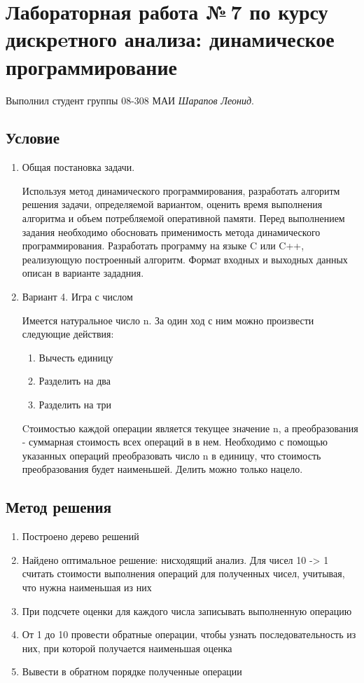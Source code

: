 \documentclass[12pt]{article}
\begin{document}
\section*{Лабораторная работа №\,7 по курсу дискрeтного анализа: динамическое программирование}

Выполнил студент группы 08-308 МАИ \textit{Шарапов Леонид}.

\subsection*{Условие}
\begin{enumerate}
\item Общая постановка задачи.

Используя метод динамического программирования, разработать алгоритм решения задачи, определяемой вариантом, оценить время выполнения алгоритма и объем потребляемой оперативной памяти. Перед выполнением задания необходимо обосновать применимость метода динамического программирования. Разработать программу на языке C или C++, реализующую построенный алгоритм. Формат входных и выходных данных описан в варианте зададния.

\item Вариант 4. Игра с числом

Имеется натуральное число n. За один ход с ним можно произвести следующие действия:

\begin{enumerate}
\item Вычесть единицу
\item Разделить на два
\item Разделить на три
\end{enumerate}

Cтоимостью каждой операции является текущее значение n, а преобразования - суммарная стоимость всех операций в в нем. Необходимо с помощью указанных операций преобразовать число n в единицу, что стоимость преобразования будет наименьшей. Делить можно только нацело.

\end{enumerate}

\subsection*{Метод решения}

\begin{enumerate}
\item Построено дерево решений
\item Найдено оптимальное решение: нисходящий анализ. Для чисел 10 -> 1 считать стоимости выполнения операций для полученных чисел, учитывая, что нужна наименьшая из них
\item При подсчете оценки для каждого числа записывать выполненную операцию
\item От 1 до 10 провести обратные операции, чтобы узнать последовательность из них, при которой получается наименьшая оценка
\item Вывести в обратном порядке полученные операции
\end{enumerate}
\end{document}
